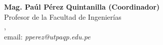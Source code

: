 \begin{center}
\textbf{Mag. Paúl Pérez Quintanilla (Coordinador)}\\
Profesor de la Facultad de Ingenierías\\
\institution, \city\\
email: \textit{pperez@utpaqp.edu.pe}
\end{center}